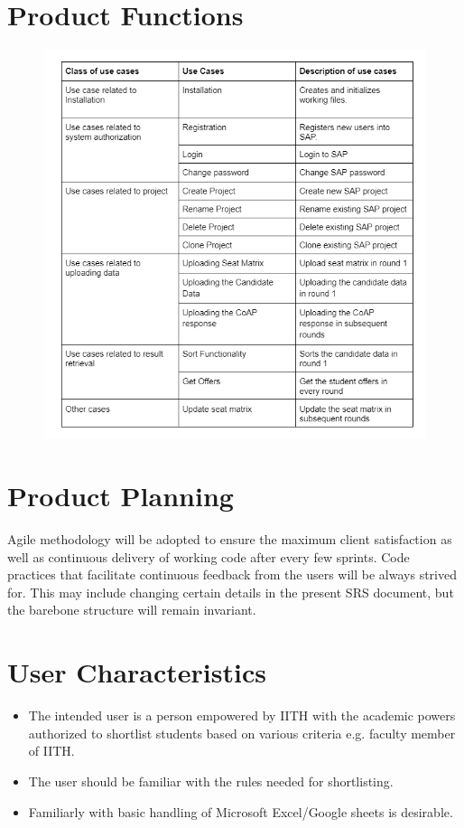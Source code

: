 \documentclass{report}
\begin{document}
\section{Product Functions}
\begin{figure}[h!]
\includegraphics[width=\textwidth]{images/table.png}
\end{figure}
\section{Product Planning}
Agile methodology will be adopted to ensure the maximum client satisfaction as well as continuous delivery of working code after every few sprints. Code practices that facilitate continuous feedback from the users will be always strived for. This may include changing certain details in the present SRS document, but the barebone structure will remain invariant.
\section{User Characteristics}
\begin{itemize}
    \item The intended user is a person empowered by IITH with the academic powers authorized to shortlist students based on various criteria e.g. faculty member of IITH.
    \item The user should be familiar with the rules needed for shortlisting. 
    \item Familiarly with basic handling of Microsoft Excel/Google sheets is desirable.
\end{itemize}
\end{document}
